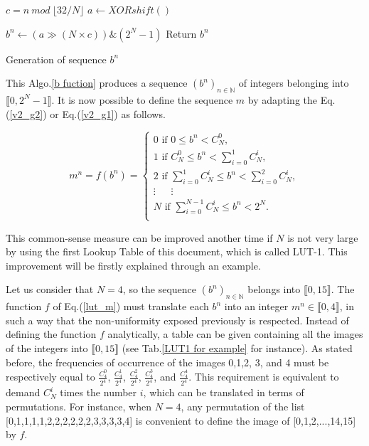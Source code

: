 \begin{algorithm}
\begin{algorithmic}[1]
\STATE $c=n~mod~\lfloor32/N\rfloor$
  \STATE $a \leftarrow XORshift()$
\ENDIF

  \STATE $b^n\leftarrow (a\gg (N \times c))\& (2^N-1)$
\STATE Return {$b^n$}
\medskip
\end{algorithmic}
\caption{Generation of sequence $b^n$}
\label{b fuction}
\end{algorithm}

This Algo.\ref{b fuction} produces a sequence $(b^n)_{n \in \mathds{N}}$ of integers belonging into 
$\llbracket 0, 2^N-1 \rrbracket$.
It is now possible to define the sequence $m$ by adapting the Eq.(\ref{v2_g2}) or 
Eq.(\ref{v2_g1}) as follows.

\begin{equation}
\label{lut_m}
m^n = f(b^n)=
\left\{
\begin{array}{l}
0 \text{ if }0				\leqslant {b^n} < {C^0_N},\\
1 \text{ if }{C^0_N}	\leqslant {b^n} < \sum_{i=0}^1 {C^i_N},\\
2 \text{ if }\sum_{i=0}^1{C^i_N}	\leqslant {b^n} < \sum_{i=0}^2 {C^i_N},\\
\vdots~~~~~					~~\vdots~~~		    ~~~~\\
N \text{ if }\sum_{i=0}^{N-1} {C^i_N}	\leqslant {b^n} < 2^N.\\
\end{array}
\right.
\end{equation}

This common-sense measure can be improved another time if $N$ is not very large by using the first Lookup 
Table of this document, which is called LUT-1.
This improvement will be firstly explained through an example.

Let us consider that $N=4$, so the sequence $(b^n)_{n \in \mathds{N}}$ belongs into $\llbracket 0, 15 \rrbracket$.
The function $f$ of Eq.(\ref{lut_m}) must translate each $b^n$ into an integer $m^n \in \llbracket 0,4 \rrbracket$, 
in such a way that the non-uniformity exposed previously is respected.
Instead of defining the function $f$ analytically, a table can be given containing all the images 
of the integers into $\llbracket 0, 15 \rrbracket$ (see Tab.\ref{LUT1 for example} for instance).
As stated before, the frequencies of occurrence of the images 0,1,2, 3, and 4 must be respectively equal 
to $\frac{C_4^0}{2^4}$, $\frac{C_4^1}{2^4}$, $\frac{C_4^2}{2^4}$, $\frac{C_4^3}{2^4}$, and $\frac{C_4^4}{2^4}$.
This requirement is equivalent to demand $C_N^i$ times the number $i$, which can be translated in terms of permutations.
For instance, when $N=4$, any permutation of the list [0,1,1,1,1,2,2,2,2,2,2,3,3,3,3,4] is convenient to 
define the image of [0,1,2,...,14,15] by $f$.

